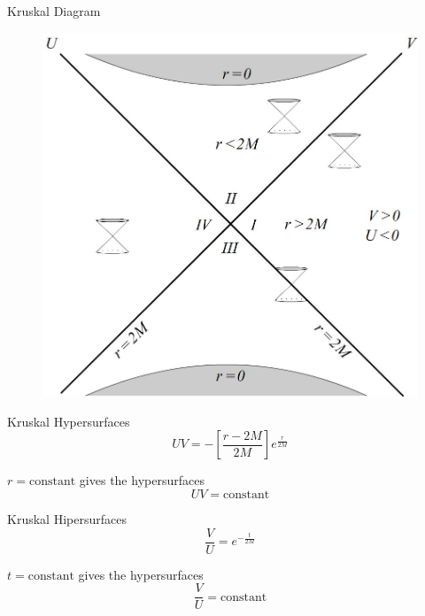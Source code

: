 \documentclass{beamer}
\begin{document}
        \begin{frame}{Kruskal Diagram}
        	\begin{center}
				\begin{figure}
				\includegraphics[scale=0.75] {fig4.jpg}
				\end{figure}
			\end{center}	
        \end{frame}
        
        \begin{frame}{Kruskal Hypersurfaces}
			$$ UV =  -\left[\frac{r-2M}{2M}\right] e^{\frac{r}{2M}} $$
            \pause
            \bigskip
            
            $r = \textrm{constant}$ gives the hypersurfaces
            $$ UV = \textrm{constant} $$
            \pause
        \end{frame}
        
        \begin{frame}{Kruskal Hipersurfaces}
			$$ \frac{V}{U}=e^{-\frac{t}{2M}} $$
            \pause
            \bigskip
            
            $t = \textrm{constant}$ gives the hypersurfaces
            $$ \frac{V}{U} = \textrm{constant} $$
            \pause
        \end{frame}
        
\end{document}
